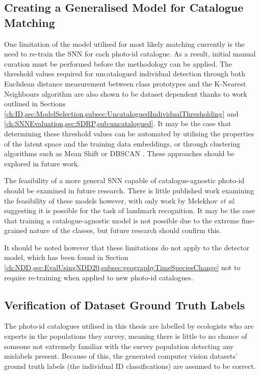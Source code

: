 \subsection{Creating a Generalised Model for Catalogue Matching}\label{ch:Conclusion,sec:FutureWork,sub:GeneralSNN}

One limitation of the model utilised for most likely matching currently is the need to re-train the SNN for each photo-id catalogue. As a result, initial manual curation must be performed before the methodology can be applied. The threshold values required for uncatalogued individual detection through both Euclidean distance measurement between class prototypes and the K-Nearest Neighbours algorithm are also shown to be dataset dependent thanks to work outlined in Sections \ref{ch:ID,sec:ModelSelection,subsec:UncataloguedIndividualThresholding} and \ref{ch:SNNEvaluation,sec:SDRP,sub:uncatalogued}. It may be the case that determining these threshold values can be automated by utilising the properties of the latent space and the training data embeddings, or through clustering algorithms such as Mean Shift \cite{cheng_mean_1995} or DBSCAN \cite{ester_density-based_1996}. These approaches should be explored in future work.

The feasibility of a more general SNN capable of catalogue-agnostic photo-id should be examined in future research. There is little published work examining the feasibility of these models however, with only work by Melekhov \textit{et al.} \cite{melekhov_siamese_2016} suggesting it is possible for the task of landmark recognition. It may be the case that training a catalogue-agnostic model is not possible due to the extreme fine-grained nature of the classes, but future research should confirm this. 

It should be noted however that these limitations do not apply to the detector model, which has been found in Section \ref{ch:NDD,sec:EvalUsingNDD20,subsec:geographyTimeSpeciesChange} not to require re-training when applied to new photo-id catalogues.

\subsection{Verification of Dataset Ground Truth Labels}\label{ch:Conclusion,sec:FutureWork,sub:verifyGroundTruths}

The photo-id catalogues utilised in this thesis are labelled by ecologists who are experts in the populations they survey, meaning there is little to no chance of someone not extremely familiar with the survey population detecting any mislabels present. Because of this, the generated computer vision datasets' ground truth labels (the individual ID classifications) are assumed to be correct. 

